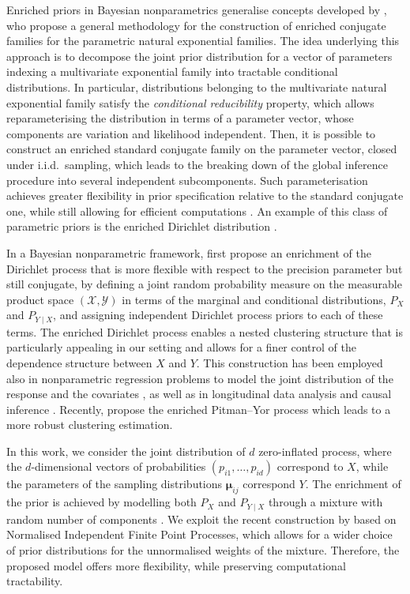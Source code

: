 \documentclass[11pt]{article}
\begin{document}
Enriched priors in Bayesian nonparametrics generalise concepts developed by \citet{consonni2001conditionally}, who propose a general methodology for the construction of enriched conjugate families for the parametric natural exponential families. 
The idea underlying this approach is to decompose the joint prior distribution for a vector of parameters indexing a multivariate exponential family into tractable conditional distributions. In particular, distributions belonging to the multivariate natural exponential family satisfy the  \textit{conditional reducibility} property, which allows reparameterising the distribution in terms
of a parameter vector, whose components are variation and likelihood independent. Then, it is possible to construct an enriched standard conjugate family on the parameter vector, closed under i.i.d.\ sampling, which leads to the breaking down of the global inference procedure into several independent subcomponents. Such parameterisation achieves  greater flexibility in prior specification relative to the standard conjugate one, while still allowing for efficient computations \citep[see, for example,][]{consonni2004reference}. An example of this class of parametric priors is the enriched Dirichlet distribution \citep{connor1969concepts}. 

In a Bayesian nonparametric framework, \citet{wade2011enriched} first propose an enrichment of the Dirichlet process \citep{ferguson1973bayesian} that is more flexible with respect to the precision parameter but still conjugate, by defining a joint  random probability measure on the measurable product space $\left(\mathcal{X},\mathcal{Y}\right)$ in terms of the marginal and conditional distributions, $P_X$ and $P_{Y\mid X}$, and assigning independent Dirichlet process priors to each of these terms. The enriched Dirichlet process enables a nested clustering structure that is particularly appealing in our setting and allows for a finer control of the dependence structure between $X$ and $Y$. This construction has been employed also in nonparametric regression problems to model the joint distribution of the response and the covariates \citep{wade2014improving, Gadd2020}, as well as in longitudinal data analysis \citep{zeldow2021functional} and causal inference \citep{roy2018bayesian}. Recently, \citet{rigon2020enriched} propose the enriched Pitman–Yor process which leads to a more robust clustering estimation.

In this work, we consider the joint distribution of $d$ zero-inflated process, where the $d$-dimensional vectors of probabilities $\left(p_{i1},\ldots,p_{id}\right)$ correspond to $X$, while the parameters of the sampling distributions $\bm \mu_{ij}$ correspond $Y$.  
The enrichment of the prior is achieved by modelling both $P_X$ and $P_{Y\mid X}$  through a mixture with random number of components \citep[see, for instance,][]{miller2018mixture}. We exploit the recent construction by \citet{Argiento2022} based on Normalised Independent Finite Point Processes, which allows for a wider choice of prior distributions for the unnormalised weights of the mixture. Therefore, the proposed model offers more flexibility, while preserving computational tractability. 
\end{document}

